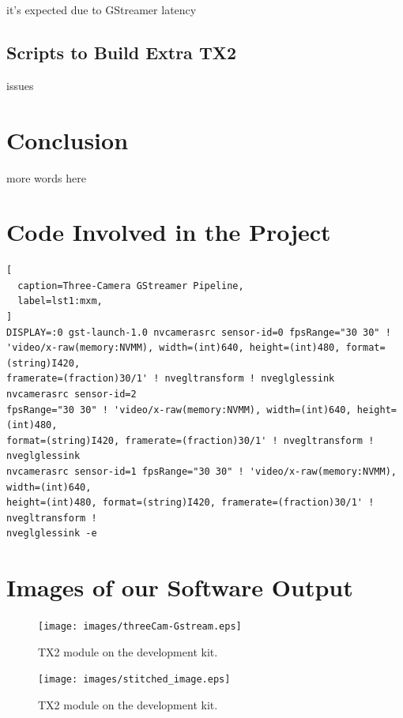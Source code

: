 \documentclass[letterpaper,10pt,serif,draftclsnofoot,onecolumn,compsoc,titlepage]{IEEEtran}
\begin{document}
it's expected due to GStreamer latency \\

\subsection{Scripts to Build Extra TX2}

issues \\

\section{Conclusion}

more words here\\

\section{Code Involved in the Project}

\begin{lstlisting}[
  caption=Three-Camera GStreamer Pipeline,
  label=lst1:mxm,
]
DISPLAY=:0 gst-launch-1.0 nvcamerasrc sensor-id=0 fpsRange="30 30" ! 
'video/x-raw(memory:NVMM), width=(int)640, height=(int)480, format=(string)I420, 
framerate=(fraction)30/1' ! nvegltransform ! nveglglessink  nvcamerasrc sensor-id=2 
fpsRange="30 30" ! 'video/x-raw(memory:NVMM), width=(int)640, height=(int)480, 
format=(string)I420, framerate=(fraction)30/1' ! nvegltransform ! nveglglessink 
nvcamerasrc sensor-id=1 fpsRange="30 30" ! 'video/x-raw(memory:NVMM), width=(int)640, 
height=(int)480, format=(string)I420, framerate=(fraction)30/1' ! nvegltransform ! 
nveglglessink -e
\end{lstlisting}

\section{Images of our Software Output}

\begin{figure}[H]
	\centering
	\label{fig:Video output of three cameras using GStreamer.}
	\texttt{[image: images/threeCam-Gstream.eps]}
	\caption{TX2 module on the development kit. \label{overflow}}
\end{figure}

\begin{figure}[H]
	\centering
	\label{fig:Video output of our stitching program using OpenCV.}
	\texttt{[image: images/stitched\_image.eps]}
	\caption{TX2 module on the development kit. \label{overflow}}
\end{figure}
\end{document}
